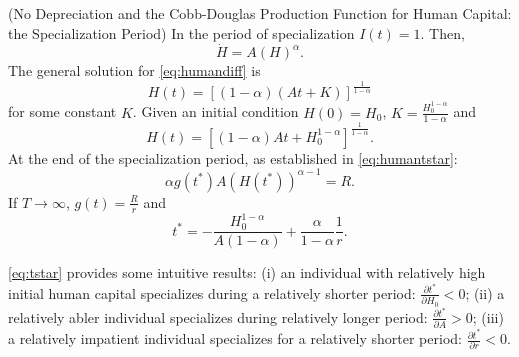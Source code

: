 \begin{case} (No Depreciation and the Cobb-Douglas Production Function for Human Capital: the Specialization Period)
In the period of specialization $I(t) = 1$. Then,
\begin{equation}
\dot{H} = A \left( H \right)^{\alpha} \label{eq:humandiff}.
\end{equation}
The general solution for \eqref{eq:humandiff} is
\begin{equation}
H(t) = \left[ (1 - \alpha)(At + K) \right]^{\frac{1}{1-\alpha}}
\end{equation}
for some constant $K$. Given an initial condition $H(0) = H_{0}$, $K = \frac{H_{0}^{1-\alpha}}{1-\alpha}$ and
\begin{equation}
H(t) = \left[ (1 - \alpha)At + H_{0}^{1-\alpha} \right]^{\frac{1}{1-\alpha}} \label{eq:hbeforetstar}.
\end{equation}
At the end of the specialization period, as established in \eqref{eq:humantstar}:
\begin{equation}
\alpha g(t^*) A \left( H(t^*) \right)^{\alpha - 1} = R.
\end{equation}
If $T \rightarrow \infty$, $g(t) = \frac{R}{r}$ and
\begin{equation}
t^* = - \frac{H_{0}^{1 - \alpha}}{A(1 - \alpha)} + \frac{\alpha}{1 - \alpha}\frac{1}{r}. \label{eq:tstar}
\end{equation}

\indent \eqref{eq:tstar} provides some intuitive results: (i) an individual with relatively high initial human capital specializes during a relatively shorter period: $\frac{\partial t^*}{\partial       H_{0}} < 0$; (ii) a relatively abler individual specializes during relatively longer period: $\frac{\partial t^*}{\partial A} > 0$; (iii) a relatively impatient individual specializes for a relatively shorter period: $\frac{\partial t^*}{\partial r} < 0$.
\end{case}

